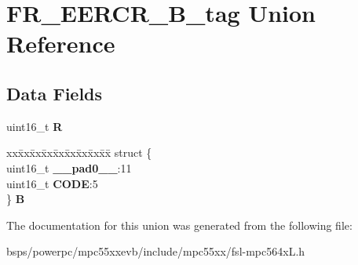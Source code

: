 \hypertarget{unionFR__EERCR__16B__tag}{}\section{F\+R\+\_\+\+E\+E\+R\+C\+R\+\_\+B\+\_\+tag Union Reference}
\label{unionFR__EERCR__16B__tag}
\subsection*{Data Fields}
\begin{DoxyCompactItemize}
\item 
\mbox{\label{unionFR__EERCR__16B__tag_a3c11b29a5cae10540a69310e47daa301}} 
uint16\+\_\+t {\bfseries R}
\item 
\mbox{\label{unionFR__EERCR__16B__tag_ac24b95f32d72fda8c39cf60091d31af8}} 
\begin{tabbing}
xx\=xx\=xx\=xx\=xx\=xx\=xx\=xx\=xx\=\kill
struct \{\\
\>uint16\_t {\bfseries \_\_pad0\_\_}:11\\
\>uint16\_t {\bfseries CODE}:5\\
\} {\bfseries B}\\

\end{tabbing}\end{DoxyCompactItemize}


The documentation for this union was generated from the following file\+:\begin{DoxyCompactItemize}
\item 
bsps/powerpc/mpc55xxevb/include/mpc55xx/fsl-\/mpc564x\+L.\+h\end{DoxyCompactItemize}
